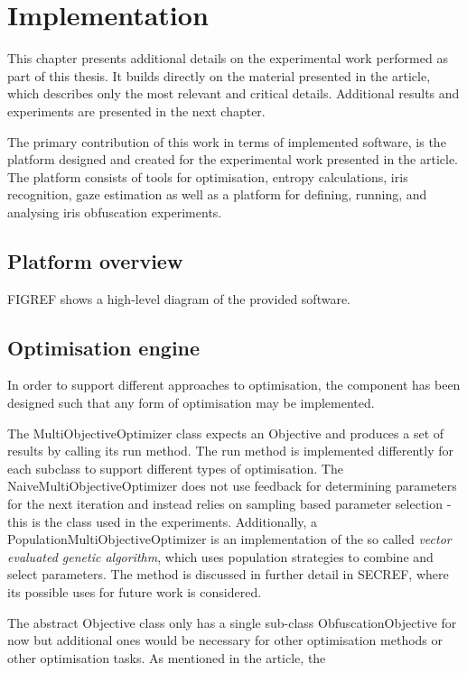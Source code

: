 \chapter{Implementation}
This chapter presents additional details on the experimental work performed as part of this thesis. It builds directly on the material presented in the article, which describes only the most relevant and critical details. Additional results and experiments are presented in the next chapter.

The primary contribution of this work in terms of implemented software, is the platform designed and created for the experimental work presented in the article. The platform consists of tools for optimisation, entropy calculations, iris recognition, gaze estimation as well as a platform for defining, running, and analysing iris obfuscation experiments. 


\section{Platform overview}
FIGREF shows a high-level diagram of the provided software. 


\section{Optimisation engine}
In order to support different approaches to optimisation, the component has been designed such that any form of optimisation may be implemented. 

The MultiObjectiveOptimizer class expects an Objective and produces a set of results by calling its run method. The run method is implemented differently for each subclass to support different types of optimisation. The NaiveMultiObjectiveOptimizer does not use feedback for determining parameters for the next iteration and instead relies on sampling based parameter selection - this is the class used in the experiments. Additionally, a PopulationMultiObjectiveOptimizer is an implementation of the so called \textit{vector evaluated genetic algorithm}, which uses population strategies to combine and select parameters. The method is discussed in further detail in SECREF, where its possible uses for future work is considered.

The abstract Objective class only has a single sub-class ObfuscationObjective for now but additional ones would be necessary for other optimisation methods or other optimisation tasks. As mentioned in the article, the 

